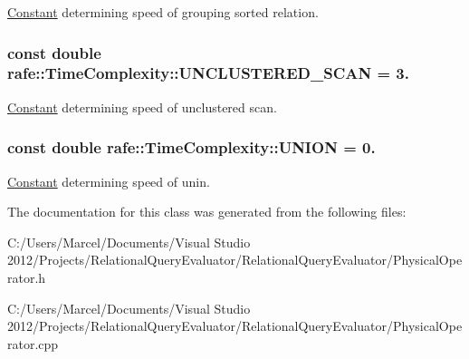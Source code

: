 \hyperlink{classrafe_1_1_constant}{Constant} determining speed of grouping sorted relation. \hypertarget{classrafe_1_1_time_complexity_a7fbcf1745878b423e54d5d42efe13154}{
\subsubsection[{U\+N\+C\+L\+U\+S\+T\+E\+R\+E\+D\+\_\+\+S\+C\+A\+N}]{\setlength{\rightskip}{0pt plus 5cm}const double rafe\+::\+Time\+Complexity\+::\+U\+N\+C\+L\+U\+S\+T\+E\+R\+E\+D\+\_\+\+S\+C\+A\+N = 3.\hspace{0.3cm}{\ttfamily [static]}}}\label{classrafe_1_1_time_complexity_a7fbcf1745878b423e54d5d42efe13154}
\hyperlink{classrafe_1_1_constant}{Constant} determining speed of unclustered scan. \hypertarget{classrafe_1_1_time_complexity_a80c58870ea145943f70db0d09375efda}{
\subsubsection[{U\+N\+I\+O\+N}]{\setlength{\rightskip}{0pt plus 5cm}const double rafe\+::\+Time\+Complexity\+::\+U\+N\+I\+O\+N = 0.\hspace{0.3cm}{\ttfamily [static]}}}\label{classrafe_1_1_time_complexity_a80c58870ea145943f70db0d09375efda}
\hyperlink{classrafe_1_1_constant}{Constant} determining speed of unin. 

The documentation for this class was generated from the following files\+:\begin{DoxyCompactItemize}
\item 
C\+:/\+Users/\+Marcel/\+Documents/\+Visual Studio 2012/\+Projects/\+Relational\+Query\+Evaluator/\+Relational\+Query\+Evaluator/Physical\+Operator.\+h\item 
C\+:/\+Users/\+Marcel/\+Documents/\+Visual Studio 2012/\+Projects/\+Relational\+Query\+Evaluator/\+Relational\+Query\+Evaluator/Physical\+Operator.\+cpp\end{DoxyCompactItemize}
